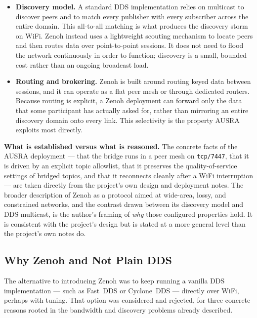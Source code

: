 \begin{itemize}
    \item \textbf{Discovery model.} A standard DDS implementation relies on multicast to discover peers and to match every publisher with every subscriber across the entire domain. This all-to-all matching is what produces the discovery storm on WiFi. Zenoh instead uses a lightweight scouting mechanism to locate peers and then routes data over point-to-point sessions. It does not need to flood the network continuously in order to function; discovery is a small, bounded cost rather than an ongoing broadcast load.
    \item \textbf{Routing and brokering.} Zenoh is built around routing keyed data between sessions, and it can operate as a flat peer mesh or through dedicated routers. Because routing is explicit, a Zenoh deployment can forward only the data that some participant has actually asked for, rather than mirroring an entire discovery domain onto every link. This selectivity is the property AUSRA exploits most directly.
\end{itemize}

\begin{notebox}
\textbf{What is established versus what is reasoned.} The concrete facts of the AUSRA deployment --- that the bridge runs in a peer mesh on \texttt{tcp/7447}, that it is driven by an explicit topic allowlist, that it preserves the quality-of-service settings of bridged topics, and that it reconnects cleanly after a WiFi interruption --- are taken directly from the project's own design and deployment notes. The broader description of Zenoh as a protocol aimed at wide-area, lossy, and constrained networks, and the contrast drawn between its discovery model and DDS multicast, is the author's framing of \emph{why} those configured properties hold. It is consistent with the project's design but is stated at a more general level than the project's own notes do.
\end{notebox}

\subsection{Why Zenoh and Not Plain DDS}
\label{subsec:why_zenoh}

The alternative to introducing Zenoh was to keep running a vanilla DDS implementation --- such as Fast~DDS or Cyclone~DDS --- directly over WiFi, perhaps with tuning. That option was considered and rejected, for three concrete reasons rooted in the bandwidth and discovery problems already described.


